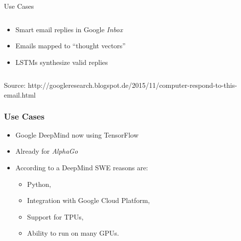 \begin{slide}{Use Cases}
\begin{columns}
  \begin{column}{0.6\textwidth}
    \begin{itemize}
      \item<2-> Smart email replies in Google \emph{Inbox}
      \item<3-> Emails mapped to ``thought vectors''
      \item<4-> LSTMs synthesize valid replies
    \end{itemize}
  \end{column}
  \begin{column}{0.4\textwidth}
    \begin{figure}
    \end{figure}
  \end{column}
\end{columns}
{\tiny Source: http://googleresearch.blogspot.de/2015/11/computer-respond-to-this-email.html}
\end{slide}

\begin{frame}
  \frametitle{Use Cases}
  \begin{itemize}
  \item<2-> Google DeepMind now using TensorFlow
  \item<3-> Already for \emph{AlphaGo}
  \item<4-> According to a DeepMind SWE reasons are:

    \begin{itemize}
      \item<5-> Python,
      \item<6-> Integration with Google Cloud Platform,
      \item<7-> Support for TPUs,
      \item<8-> Ability to run on many GPUs.
    \end{itemize}
  \end{itemize}
\end{frame}

